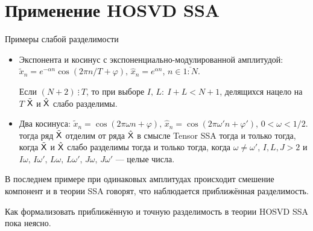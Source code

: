 \documentclass[ucs, notheorems, handout]{beamer}
\begin{document}
    \section{Применение HOSVD SSA}\label{sec:tssa-use}
    \begin{frame}{Примеры слабой разделимости}
        \begin{itemize}
            \item Экспонента и косинус с экспоненциально-модулированной амплитудой: $\tilde{x}_n=e^{-\alpha n}\cos(2\pi n / T + \varphi),\, \hat{x}_n=e^{\alpha n}$, $n \in \overline{1:N}$.

            Если $(N+2)\: \vdots \: T$, то при выборе $I,\, L:\: I+L< N+1$, делящихся нацело на $T$ $\tilde{\mathsf{X}}$ и $\hat{\mathsf{X}}$
            слабо разделимы.

            \item Два косинуса: $\tilde{x}_n=\cos(2\pi \omega n + \varphi),\, \hat{x}_n=\cos(2\pi \omega' n + \varphi')$, $0 < \omega < 1/2$.
            тогда ряд $\tilde{\mathsf{X}}$ отделим от ряда $\hat{\mathsf{X}}$ в смысле Tensor SSA тогда и только тогда, когда
            $\tilde{\mathsf{X}}$ и $\hat{\mathsf{X}}$ слабо разделимы тогда и только тогда, когда $\omega\ne\omega'$, $I, L, J > 2$ и $I\omega,\,
            I\omega',\, L\omega,\, L\omega',\, J\omega,\, J\omega'$ --- целые числа.
        \end{itemize}

        \vspace{0.3cm}
        В последнем примере при одинаковых амплитудах происходит смешение компонент и в теории SSA говорят,
        что наблюдается приближённая разделимость.

        Как формализовать приближённую и точную разделимость в теории HOSVD SSA пока неясно.

    \end{frame}
\end{document}
